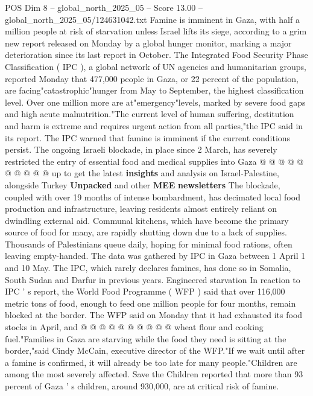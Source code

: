 \begin{textsample}{POS Dim 8 – global\_north\_2025\_05 – Score 13.00 – global\_north\_2025\_05/124631042.txt}  \label{ex:f8_pos_036}
Famine is imminent in Gaza, with half a million people at risk of starvation unless Israel lifts its siege, according to a grim new report released on Monday by a global hunger monitor, marking a major deterioration since its last report in October.
The Integrated Food Security Phase Classification ( IPC ), a global network of UN agencies and humanitarian groups, reported Monday that 477,000 people in Gaza, or 22 percent of the population, are facing"catastrophic"hunger from May to September, the highest classification level.
Over one million more are at"emergency"levels, marked by severe food gaps and high acute malnutrition."The current level of human suffering, destitution and harm is extreme and requires urgent action from all parties,"the IPC said in its report.
The IPC warned that famine is imminent if the current conditions persist.
The ongoing Israeli blockade, in place since 2 March, has severely restricted the entry of essential food and medical supplies into Gaza @ @ @ @ @ @ @ @ @ @ up to get the latest \textbf{insights} and analysis on Israel-Palestine, alongside Turkey \textbf{Unpacked} and other \textbf{MEE} \textbf{newsletters} The blockade, coupled with over 19 months of intense bombardment, has decimated local food production and infrastructure, leaving residents almost entirely reliant on dwindling external aid.
Communal kitchens, which have become the primary source of food for many, are rapidly shutting down due to a lack of supplies.
Thousands of Palestinians queue daily, hoping for minimal food rations, often leaving empty-handed.
The data was gathered by IPC in Gaza between 1 April 1 and 10 May.
The IPC, which rarely declares famines, has done so in Somalia, South Sudan and Darfur in previous years.
Engineered starvation In reaction to IPC ' s report, the World Food Programme ( WFP ) said that over 116,000 metric tons of food, enough to feed one million people for four months, remain blocked at the border.
The WFP said on Monday that it had exhausted its food stocks in April, and @ @ @ @ @ @ @ @ @ @ wheat flour and cooking fuel."Families in Gaza are starving while the food they need is sitting at the border,"said Cindy McCain, executive director of the WFP."If we wait until after a famine is confirmed, it will already be too late for many people."Children are among the most severely affected.
Save the Children reported that more than 93 percent of Gaza ' s children, around 930,000, are at critical risk of famine.

\end{textsample}
